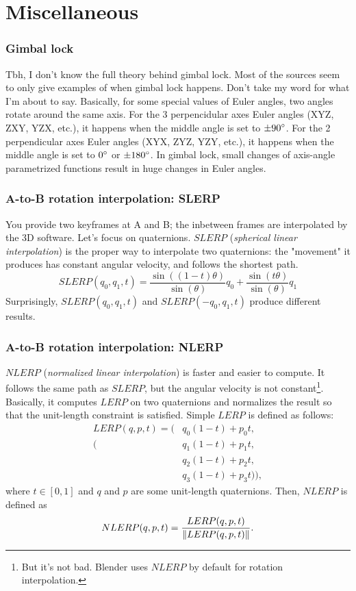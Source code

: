 \documentclass{beamer}
\begin{document}

\section{Miscellaneous}


\begin{frame}
\frametitle{Gimbal lock}
Tbh, I don't know the full theory behind gimbal lock. Most of the sources seem to only give examples of when gimbal lock happens. Don't take my word for what I'm about to say.
\vfill
Basically, for some special values of Euler angles, two angles rotate around the same axis.
\vfill
For the 3 perpencidular axes Euler angles (XYZ, ZXY, YZX, etc.), it happens when the middle angle is set to $\pm{90}^{\circ}$. 
\vfill
For the 2 perpendicular axes Euler angles (XYX, ZYZ, YZY, etc.), it happens when the middle angle is set to ${0}^{\circ}$ or $\pm{180}^{\circ}$.
\vfill
In gimbal lock, small changes of axis-angle parametrized functions result in huge changes in Euler angles.
\end{frame}


\begin{frame}
\frametitle{A-to-B rotation interpolation: SLERP}
You provide two keyframes at A and B; the inbetween frames are interpolated by the 3D software. Let's focus on quaternions.
\vfill
$SLERP$ (\textit{spherical linear interpolation}) is the proper way to interpolate two quaternions: the "movement" it produces has constant angular velocity, and follows the shortest path.
\begin{equation*} 
SLERP(q_0, q_1, t) = 
\frac{\sin((1-t)\theta)}{\sin(\theta)}q_0 + \frac{\sin(t\theta)}{\sin(\theta)}q_1 
\end{equation*}
Surprisingly, $SLERP(q_0, q_1, t)$ and $SLERP(-q_0, q_1, t)$ produce different results.
\end{frame}

\begin{frame}
	\frametitle{A-to-B rotation interpolation: NLERP}
$NLERP$ (\textit{normalized linear interpolation}) is faster and easier to compute. It follows the same path as $SLERP$, but the angular velocity is not constant\footnote{But it's not bad. Blender uses $NLERP$ by default for rotation interpolation.}. Basically, it computes $LERP$ on two quaternions and normalizes the result so that the unit-length constraint is satisfied. 
\vfill
Simple $LERP$ is defined as follows:
\begin{align*}
	LERP(q,p,t) = (&q_0(1-t) + p_0t, \\
	(&q_1(1-t) + p_1t, \\
	&q_2(1-t) + p_2t, \\
	&q_3(1-t) + p_3t )),
\end{align*}
where $t \in [0,1]$ and $q$ and $p$ are some unit-length quaternions. Then, $NLERP$ is defined as
 $$
NLERP(q,p,t) = 
\frac{LERP(q,p,t)}{\left\lVert LERP(q,p,t)\right\rVert}.
$$
\end{frame}
\end{document}
